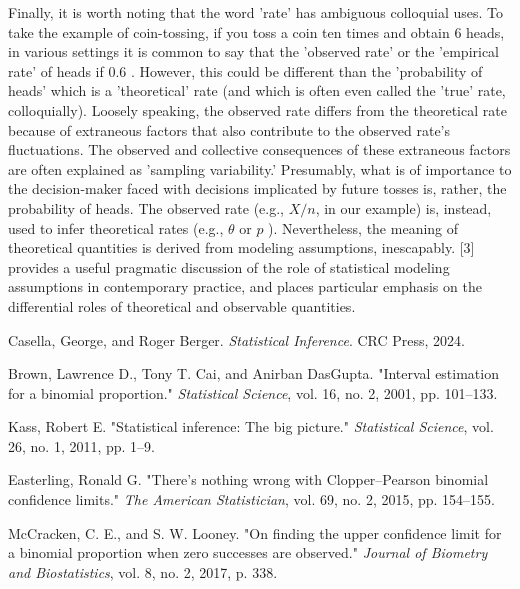 Finally, it is worth noting that the word 'rate' has ambiguous colloquial uses. To take the example of coin-tossing, if you toss a coin ten times and obtain 6 heads, in various settings it is common to say that the 'observed rate' or the 'empirical rate' of heads if 0.6 . However, this could be different than the 'probability of heads' which is a 'theoretical' rate (and which is often even called the 'true' rate, colloquially). Loosely speaking, the observed rate differs from the theoretical rate because of extraneous factors that also contribute to the observed rate's fluctuations. The observed and collective consequences of these extraneous factors are often explained as 'sampling variability.' Presumably, what is of importance to the decision-maker faced with decisions implicated by future tosses is, rather, the probability of heads. The observed rate (e.g., $X / n$, in our example) is, instead, used to infer theoretical rates (e.g., $\theta$ or $p$ ). Nevertheless, the meaning of theoretical quantities is derived from modeling assumptions, inescapably. [3] provides a useful pragmatic discussion of the role of statistical modeling assumptions in contemporary practice, and places particular emphasis on the differential roles of theoretical and observable quantities.


\begin{thebibliography}{99}
Casella, George, and Roger Berger. \textit{Statistical Inference}. CRC Press, 2024.

Brown, Lawrence D., Tony T. Cai, and Anirban DasGupta. "Interval estimation for a binomial proportion." \textit{Statistical Science}, vol. 16, no. 2, 2001, pp. 101–133.

Kass, Robert E. "Statistical inference: The big picture." \textit{Statistical Science}, vol. 26, no. 1, 2011, pp. 1–9.

Easterling, Ronald G. "There’s nothing wrong with Clopper–Pearson binomial confidence limits." \textit{The American Statistician}, vol. 69, no. 2, 2015, pp. 154–155.

McCracken, C. E., and S. W. Looney. "On finding the upper confidence limit for a binomial proportion when zero successes are observed." \textit{Journal of Biometry and Biostatistics}, vol. 8, no. 2, 2017, p. 338.

\end{thebibliography}
